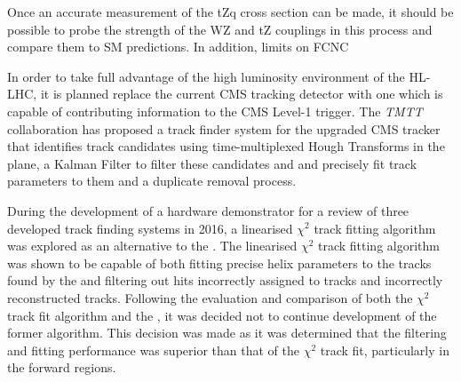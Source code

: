 Once an accurate measurement of the tZq cross section can be made, it should be possible to probe  the strength of the WZ and tZ couplings in this process and compare them to SM predictions.
In addition, limits on FCNC



%
%


In order to take full advantage of the high luminosity environment of the HL-LHC, it is planned replace the current CMS tracking detector with one which is capable of contributing information to the CMS Level-1 trigger.
The \emph{TMTT} collaboration has proposed a track finder system for the upgraded CMS tracker that identifies track candidates using time-multiplexed Hough Transforms in the \rphi plane, a Kalman Filter to filter these candidates and and precisely fit track parameters to them and a duplicate removal process.

During the development of a hardware demonstrator for a review of three developed track finding systems in 2016, a linearised $\chi^{2}$ track fitting algorithm was explored as an alternative to the \KF.
The linearised $\chi^{2}$ track fitting algorithm was shown to be capable of both fitting precise helix parameters to the tracks found by the \HT and filtering out hits incorrectly assigned to tracks and incorrectly reconstructed tracks.
Following the evaluation and comparison of both the $\chi^{2}$ track fit algorithm and the \KF, it was decided not to continue development of the former algorithm.
This decision was made as it was determined that the \KF filtering and fitting performance was superior than that of the $\chi^{2}$ track fit, particularly in the forward regions.

